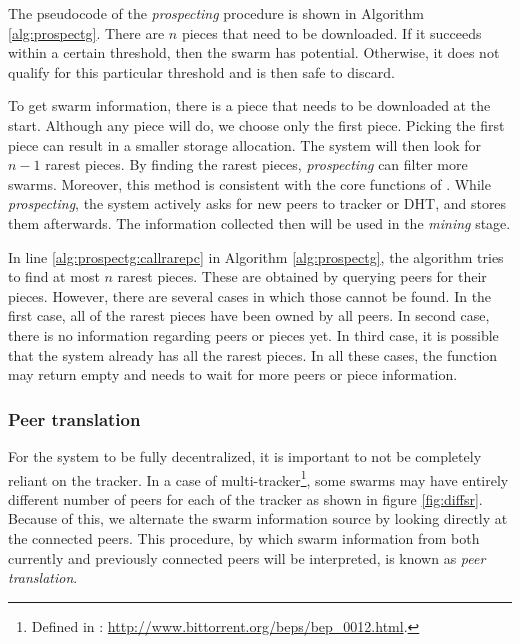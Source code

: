 The pseudocode of the \textit{prospecting} procedure is shown in Algorithm \ref{alg:prospectg}. There are $n$ pieces that need to be downloaded. If it succeeds within a certain threshold, then the swarm has potential. Otherwise, it does not qualify for this particular threshold and is then safe to discard. 

To get swarm information, there is a piece that needs to be downloaded at the start. Although any piece will do, we choose only the first piece. Picking the first piece can result in a smaller storage allocation. The system will then look for $n - 1$ rarest pieces. By finding the rarest pieces, \textit{prospecting} can filter more swarms. Moreover, this method is consistent with the core functions of \bt. While \textit{prospecting}, the system actively asks for new peers to tracker or DHT, and stores them afterwards. The information collected then will be used in the \textit{mining} stage. 


In line \ref{alg:prospectg:callrarepc} in Algorithm \ref{alg:prospectg}, the algorithm tries to find  at most $n$ rarest pieces. These are obtained by querying peers for their pieces. However, there are several cases in which those cannot be found. In the first case, all of the rarest pieces have been owned by all peers. In second case, there is no information regarding peers or pieces yet. In third case, it is possible that the system already has all the rarest pieces. In all these cases, the function may return empty and needs to wait for more peers or piece information.

\subsubsection{Peer translation}
For the system to be fully decentralized, it is important to not be completely reliant on the tracker. In a case of multi-tracker\footnote{Defined in : \url{http://www.bittorrent.org/beps/bep_0012.html}.}, some swarms may have entirely different number of peers for each of the tracker as shown in figure \ref{fig:diffsr}. Because of this, we alternate the swarm information source by looking directly at the connected peers. This procedure, by which swarm information from both currently and previously connected peers will be interpreted, is known as \textit{peer translation}. 

